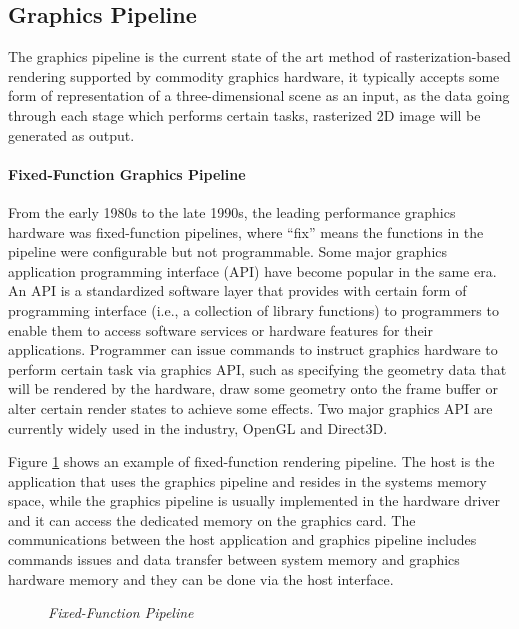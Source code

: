 \subsection{Graphics Pipeline}
The graphics pipeline is the current state of the art method of rasterization-based rendering supported by commodity graphics hardware, it typically accepts some form of representation of a three-dimensional scene as an input, as the data going through each stage which performs certain tasks, rasterized 2D image will be generated as output. 

\paragraph{Fixed-Function Graphics Pipeline}
From the early 1980s to the late 1990s, the leading performance graphics hardware was fixed-function pipelines, where ``fix'' means the functions in the pipeline were configurable but not programmable. Some major graphics application programming interface (API) have become popular in the same era. An API is a standardized software layer that provides with certain form of programming interface (i.e., a collection of library functions) to programmers to enable them to access software services or hardware features for their applications. Programmer can issue commands to instruct graphics hardware to perform certain task via graphics API, such as specifying the geometry data that will be rendered by the hardware, draw some geometry onto the frame buffer or alter certain render states to achieve some effects. Two major graphics API are currently widely used in the industry, OpenGL and Direct3D.

Figure \ref{fig:fixed_function_pipeline} shows an example of fixed-function rendering pipeline. The host is the application that uses the graphics pipeline and resides in the systems memory space, while the graphics pipeline is usually implemented in the hardware driver and it can access the dedicated memory on the graphics card. The communications between the host application and graphics pipeline includes commands issues and data transfer between system memory and graphics hardware memory and they can be done via the host interface. 

\begin{figure}[htp] 
    \centering 
    \renewcommand{\thefigure}{\thechapter.\arabic{figure}}
    \caption[Fixed-function pipeline]{\emph{Fixed-Function Pipeline}}
    \label{fig:fixed_function_pipeline} 
\end{figure}

